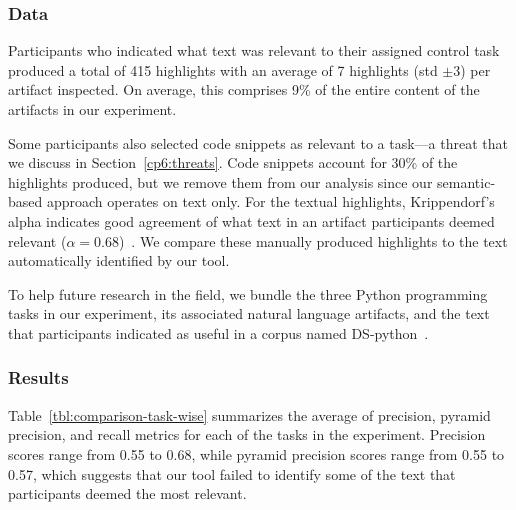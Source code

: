 \subsubsection{Data}






Participants who indicated what text was relevant to their assigned control task produced a total of 415 highlights with an average of 7 highlights (std $\pm 3$) per artifact inspected.
On average, this comprises 9\% of the entire content of the artifacts in our experiment. 


Some participants also selected code snippets as relevant to a task---a threat that we discuss in Section~\ref{cp6:threats}. 
Code snippets account for 30\% of the highlights produced, but we remove them from our analysis since our semantic-based approach 
operates on text only. For the textual highlights,
Krippendorf's alpha indicates good agreement of what text in an artifact participants deemed relevant ($\alpha = 0.68$)~\cite{Krippendorff1980, passonneau2006}.
We compare these manually produced highlights to the text automatically identified by our tool.



To help future research in the field, we bundle the three Python programming tasks in our experiment, its associated natural language artifacts, and the text that participants indicated as useful in a corpus named \acs{DS-python}~\cite{cp6_supplementary_material}.



\subsubsection{Results}



Table~\ref{tbl:comparison-task-wise} summarizes the average of precision, pyramid precision, and recall metrics for each of the tasks in the experiment.
Precision scores range from 0.55 to 0.68, while pyramid precision scores range from 0.55 to 0.57, which suggests that our tool failed to identify some of the text that participants deemed the most relevant.




